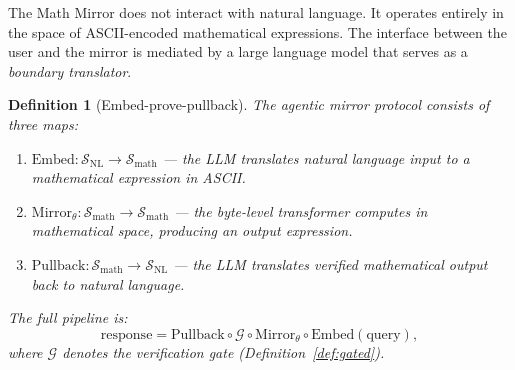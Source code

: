 \documentclass[11pt,a4paper]{article}
\newtheorem{definition}[theorem]{Definition}
\newcommand{\cG}{\mathcal{G}}
\newcommand{\cS}{\mathcal{S}}
\newcommand{\Embed}{\mathrm{Embed}}
\newcommand{\Pullback}{\mathrm{Pullback}}
\newcommand{\Mirror}{\mathrm{Mirror}}
\begin{document}
The Math Mirror does not interact with natural language.
It operates entirely in the space of ASCII-encoded mathematical
expressions.
The interface between the user and the mirror is mediated
by a large language model that serves as a \emph{boundary
translator}.

\begin{definition}[Embed-prove-pullback]\label{def:epp}
The agentic mirror protocol consists of three maps:
\begin{enumerate}[label=(\arabic*),nosep]
\item $\Embed : \cS_{\text{NL}} \to \cS_{\text{math}}$
  --- the LLM translates natural language input
  to a mathematical expression in ASCII.
\item $\Mirror_\theta : \cS_{\text{math}} \to \cS_{\text{math}}$
  --- the byte-level transformer computes in
  mathematical space, producing an output expression.
\item $\Pullback : \cS_{\text{math}} \to \cS_{\text{NL}}$
  --- the LLM translates verified mathematical output
  back to natural language.
\end{enumerate}
The full pipeline is:
\begin{equation}\label{eq:pipeline}
\text{response} = \Pullback \circ \cG \circ \Mirror_\theta \circ \Embed(\text{query}),
\end{equation}
where $\cG$ denotes the verification gate (Definition~\ref{def:gated}).
\end{definition}
\end{document}
